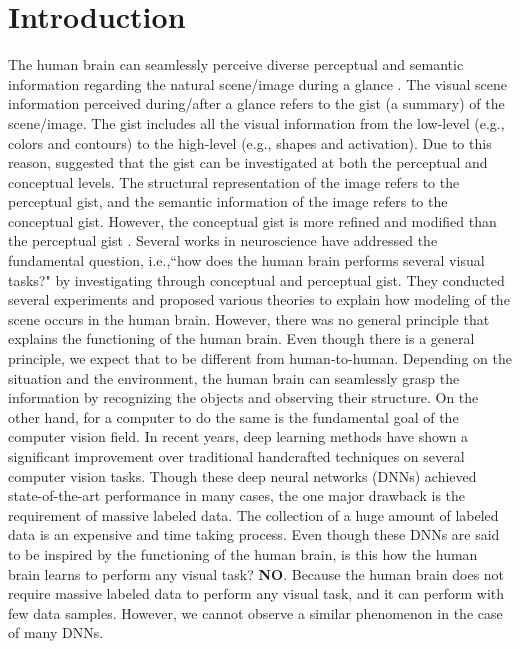 \documentclass{article}
\begin{document}
\section{Introduction}
\label{intro}
The human brain can seamlessly perceive diverse perceptual and semantic information regarding the natural scene/image during a glance \cite{friedman1979framing,potter1976short,intraub1981rapid,oliva2001modeling}. The visual scene information perceived during/after a glance refers to the gist (a summary) of the scene/image. The gist includes all the visual information from the low-level (e.g., colors and contours) to the high-level (e.g., shapes and activation). Due to this reason, \cite{oliva2005gist} suggested that the gist can be investigated at both the perceptual and conceptual levels. The structural representation of the image refers to the perceptual gist, and the semantic information of the image refers to the conceptual gist. However, the conceptual gist is more refined and modified than the perceptual gist \cite{oliva2005gist}. Several works \cite{rayner1998eye,biederman1987recognition,oliva2001modeling,oliva2000diagnostic,henderson2003human,evans2005perception,fei2007we} in neuroscience have addressed the fundamental question, i.e.,``how does the human brain performs several visual tasks?" by investigating through conceptual and perceptual gist. They conducted several experiments and proposed various theories to explain how modeling of the scene occurs in the human brain. However, there was no general principle that explains the functioning of the human brain. Even though there is a general principle, we expect that to be different from human-to-human. Depending on the situation and the environment, the human brain can seamlessly grasp the information by recognizing the objects and observing their structure. On the other hand, for a computer to do the same is the fundamental goal of the computer vision field. \newline
In recent years, deep learning methods have shown a significant improvement over traditional handcrafted techniques on several computer vision tasks. Though these deep neural networks (DNNs) achieved state-of-the-art performance in many cases, the one major drawback is the requirement of massive labeled data. The collection of a huge amount of labeled data is an expensive and time taking process. Even though these DNNs are said to be inspired by the functioning of the human brain, is this how the human brain learns to perform any visual task? \textbf{NO}. Because the human brain does not require massive labeled data to perform any visual task, and it can perform with few data samples. However, we cannot observe a similar phenomenon in the case of many DNNs. \newline
\end{document}
